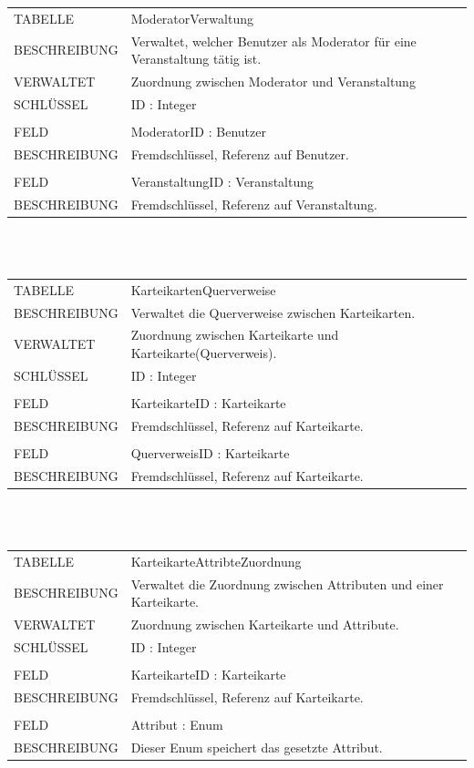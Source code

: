 \documentclass[12pt,a4paper]{article}
\begin{document}
\begin{tabular}{|lp{12cm}|}
	\hline
	TABELLE			&  ModeratorVerwaltung\\ 
	BESCHREIBUNG	&  Verwaltet, welcher Benutzer als Moderator für eine Veranstaltung tätig ist.\\ 
	VERWALTET		&  Zuordnung zwischen Moderator und Veranstaltung\\ 
	SCHLÜSSEL		&  ID : Integer\\ 
	\hline
	&  \\
	FELD		    &  ModeratorID : Benutzer\\ 
	BESCHREIBUNG	&  Fremdschlüssel, Referenz auf Benutzer.\\
	&  \\
	FELD		    &  VeranstaltungID : Veranstaltung\\ 
	BESCHREIBUNG	&  Fremdschlüssel, Referenz auf Veranstaltung.\\
	\hline
\end{tabular}\\\\

\begin{tabular}{|lp{12cm}|}
	\hline
	TABELLE			&  KarteikartenQuerverweise\\ 
	BESCHREIBUNG	&  Verwaltet die Querverweise zwischen Karteikarten.\\ 
	VERWALTET		&  Zuordnung zwischen Karteikarte und Karteikarte(Querverweis).\\ 
	SCHLÜSSEL		&  ID : Integer\\ 
	\hline
	&  \\
	FELD		    &  KarteikarteID : Karteikarte\\ 
	BESCHREIBUNG	&  Fremdschlüssel, Referenz auf Karteikarte.\\
	&  \\
	FELD		    &  QuerverweisID : Karteikarte\\ 
	BESCHREIBUNG	&  Fremdschlüssel, Referenz auf Karteikarte.\\
	\hline
\end{tabular}\\\\

\begin{tabular}{|lp{12cm}|}
	\hline
	TABELLE			&  KarteikarteAttribteZuordnung\\ 
	BESCHREIBUNG	&  Verwaltet die Zuordnung zwischen Attributen und einer Karteikarte.\\ 
	VERWALTET		&  Zuordnung zwischen Karteikarte und Attribute.\\ 
	SCHLÜSSEL		&  ID : Integer\\ 
	\hline
	&  \\
	FELD		    &  KarteikarteID : Karteikarte\\ 
	BESCHREIBUNG	&  Fremdschlüssel, Referenz auf Karteikarte.\\
	&  \\
	FELD		    &  Attribut : Enum\\ 
	BESCHREIBUNG	&  Dieser Enum speichert das gesetzte Attribut.\\
	\hline
\end{tabular}\\\\
\end{document}
